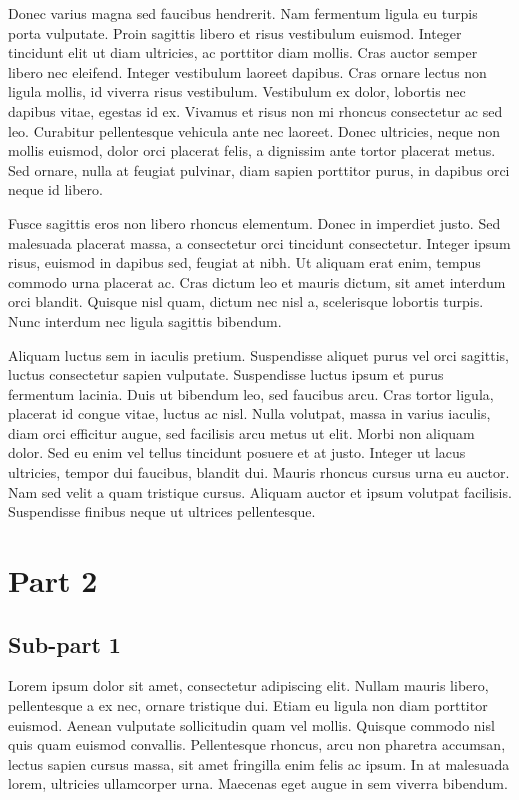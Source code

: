 \documentclass[a4paper,15pt]{article}
\begin{document}
Donec varius magna sed faucibus hendrerit. Nam fermentum ligula eu turpis porta vulputate. Proin sagittis libero et risus vestibulum euismod. Integer tincidunt elit ut diam ultricies, ac porttitor diam mollis. Cras auctor semper libero nec eleifend. Integer vestibulum laoreet dapibus. Cras ornare lectus non ligula mollis, id viverra risus vestibulum. Vestibulum ex dolor, lobortis nec dapibus vitae, egestas id ex. Vivamus et risus non mi rhoncus consectetur ac sed leo. Curabitur pellentesque vehicula ante nec laoreet. Donec ultricies, neque non mollis euismod, dolor orci placerat felis, a dignissim ante tortor placerat metus. Sed ornare, nulla at feugiat pulvinar, diam sapien porttitor purus, in dapibus orci neque id libero.

Fusce sagittis eros non libero rhoncus elementum. Donec in imperdiet justo. Sed malesuada placerat massa, a consectetur orci tincidunt consectetur. Integer ipsum risus, euismod in dapibus sed, feugiat at nibh. Ut aliquam erat enim, tempus commodo urna placerat ac. Cras dictum leo et mauris dictum, sit amet interdum orci blandit. Quisque nisl quam, dictum nec nisl a, scelerisque lobortis turpis. Nunc interdum nec ligula sagittis bibendum.

Aliquam luctus sem in iaculis pretium. Suspendisse aliquet purus vel orci sagittis, luctus consectetur sapien vulputate. Suspendisse luctus ipsum et purus fermentum lacinia. Duis ut bibendum leo, sed faucibus arcu. Cras tortor ligula, placerat id congue vitae, luctus ac nisl. Nulla volutpat, massa in varius iaculis, diam orci efficitur augue, sed facilisis arcu metus ut elit. Morbi non aliquam dolor. Sed eu enim vel tellus tincidunt posuere et at justo. Integer ut lacus ultricies, tempor dui faucibus, blandit dui. Mauris rhoncus cursus urna eu auctor. Nam sed velit a quam tristique cursus. Aliquam auctor et ipsum volutpat facilisis. Suspendisse finibus neque ut ultrices pellentesque.

\section{Part 2}

\subsection{Sub-part 1}

Lorem ipsum dolor sit amet, consectetur adipiscing elit. Nullam mauris libero, pellentesque a ex nec, ornare tristique dui. Etiam eu ligula non diam porttitor euismod. Aenean vulputate sollicitudin quam vel mollis. Quisque commodo nisl quis quam euismod convallis. Pellentesque rhoncus, arcu non pharetra accumsan, lectus sapien cursus massa, sit amet fringilla enim felis ac ipsum. In at malesuada lorem, ultricies ullamcorper urna. Maecenas eget augue in sem viverra bibendum.
\end{document}
